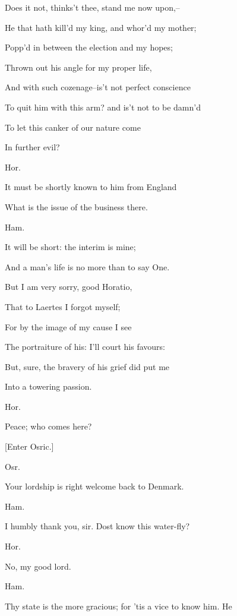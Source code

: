 \documentclass[12pt]{book}
\begin{document}
Does it not, thinks't thee, stand me now upon,--

He that hath kill'd my king, and whor'd my mother;

Popp'd in between the election and my hopes;

Thrown out his angle for my proper life,

And with such cozenage--is't not perfect conscience

To quit him with this arm? and is't not to be damn'd

To let this canker of our nature come

In further evil?



Hor.

It must be shortly known to him from England

What is the issue of the business there.



Ham.

It will be short: the interim is mine;

And a man's life is no more than to say One.

But I am very sorry, good Horatio,

That to Laertes I forgot myself;

For by the image of my cause I see

The portraiture of his: I'll court his favours:

But, sure, the bravery of his grief did put me

Into a towering passion.



Hor.

Peace; who comes here?



[Enter Osric.]



Osr.

Your lordship is right welcome back to Denmark.



Ham.

I humbly thank you, sir. Dost know this water-fly?



Hor.

No, my good lord.



Ham.

Thy state is the more gracious; for 'tis a vice to know him. He
\end{document}
